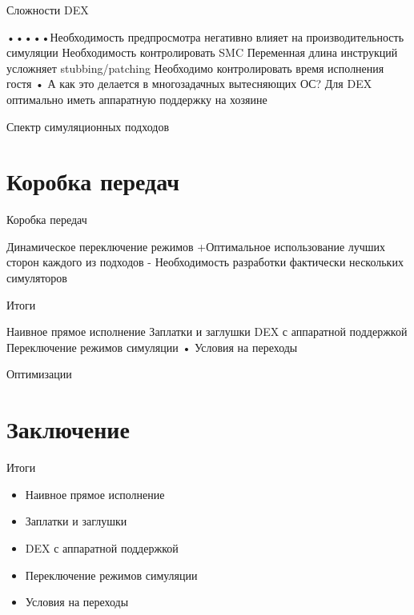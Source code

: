 \documentclass{beamer}
\begin{document}
\begin{frame}[fragile]{Сложности DEX}

•••••Необходимость предпросмотра негативно
влияет на производительность симуляции
Необходимость контролировать SMC
Переменная длина инструкций усложняет
stubbing/patching
Необходимо контролировать время
исполнения гостя
• А как это делается в многозадачных
вытесняющих ОС?
Для DEX оптимально иметь аппаратную
поддержку на хозяине

\end{frame}

\begin{frame}{Спектр симуляционных подходов}

\end{frame}

\section{Коробка передач}

\begin{frame}{Коробка передач}

\end{frame}


\begin{frame}{Динамическое переключение режимов}
+Оптимальное использование
лучших сторон каждого из подходов
- Необходимость разработки
фактически нескольких симуляторов

\end{frame}

\begin{frame}{Итоги}

Наивное прямое исполнение
Заплатки и заглушки
DEX с аппаратной поддержкой
Переключение режимов симуляции
• Условия на переходы
    
\end{frame}

\begin{frame}{Оптимизации}
\centering


\end{frame}

\section{Заключение}

\begin{frame}{Итоги}
\begin{itemize}

\item Наивное прямое исполнение

\item Заплатки и заглушки

\item DEX с аппаратной поддержкой

\item Переключение режимов симуляции

\item Условия на переходы

\end{itemize}
\end{frame}
\end{document}
